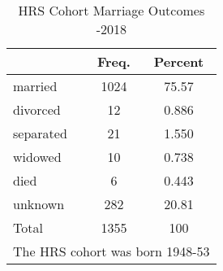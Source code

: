 \begin{table}[htbp]\centering
\def\sym#1{\ifmmode^{#1}\else\(^{#1}\)\fi}
\caption{HRS Cohort Marriage Outcomes -2018}
\begin{tabular}{l*{1}{cc}}
\hline\hline
            &       Freq.&     Percent\\
\hline
married     &        1024&       75.57\\
divorced    &          12&       0.886\\
separated   &          21&       1.550\\
widowed     &          10&       0.738\\
died        &           6&       0.443\\
unknown     &         282&       20.81\\
Total       &        1355&         100\\
\hline\hline
\multicolumn{3}{l}{\footnotesize The HRS cohort was born 1948-53}\\
\end{tabular}
\end{table}
